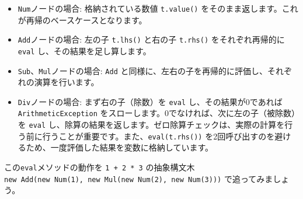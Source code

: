 \begin{itemize}
\item
  \texttt{Num}ノードの場合: 格納されている数値 \texttt{t.value()}
  をそのまま返します。これが再帰のベースケースとなります。
\item
  \texttt{Add}ノードの場合: 左の子 \texttt{t.lhs()} と右の子
  \texttt{t.rhs()} をそれぞれ再帰的に \texttt{eval}
  し、その結果を足し算します。
\item
  \texttt{Sub}、\texttt{Mul}ノードの場合: \texttt{Add}
  と同様に、左右の子を再帰的に評価し、それぞれの演算を行います。
\item
  \texttt{Div}ノードの場合: まず右の子（除数）を \texttt{eval}
  し、その結果が0であれば \texttt{ArithmeticException}
  をスローします。0でなければ、次に左の子（被除数）を \texttt{eval}
  し、除算の結果を返します。ゼロ除算チェックは、実際の計算を行う前に行うことが重要です。また、\texttt{eval(t.rhs())}
  を2回呼び出すのを避けるため、一度評価した結果を変数に格納しています。
\end{itemize}

この\texttt{eval}メソッドの動作を \texttt{1\ +\ 2\ *\ 3} の抽象構文木
\texttt{new\ Add(new\ Num(1),\ new\ Mul(new\ Num(2),\ new\ Num(3)))}
で追ってみましょう。

